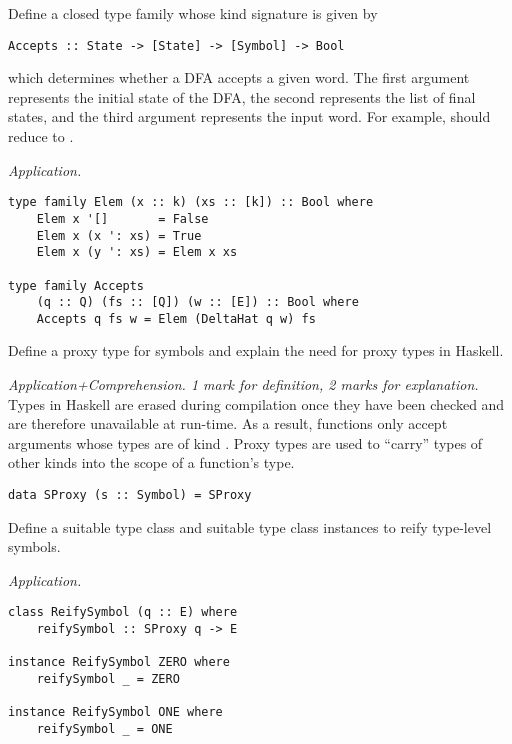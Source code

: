 \begin{parts}
\begin{subparts}
        \ifprintanswers \else \pagebreak \fi
    
        \subpart[8] Define a closed type family whose kind signature is given by 
        \vspace*{0.2cm}
\begin{verbatim}
Accepts :: State -> [State] -> [Symbol] -> Bool
\end{verbatim}
\vspace*{0.2cm}
        which determines whether a DFA accepts a given word. The first argument represents the initial state of the DFA, the second represents the list of final states, and the third argument represents the input word. For example,  should reduce to .
        \droppoints 
        
        \begin{solution}
            \emph{Application.}
\begin{verbatim}
type family Elem (x :: k) (xs :: [k]) :: Bool where 
    Elem x '[]       = False 
    Elem x (x ': xs) = True 
    Elem x (y ': xs) = Elem x xs

type family Accepts 
    (q :: Q) (fs :: [Q]) (w :: [E]) :: Bool where 
    Accepts q fs w = Elem (DeltaHat q w) fs
\end{verbatim}
        \end{solution}
        
        \subpart[3] Define a proxy type for symbols and explain the need for proxy types in Haskell. \droppoints 
        
        \begin{solution}
            \emph{Application+Comprehension. 1 mark for definition, 2 marks for explanation.} Types in Haskell are erased during compilation once they have been checked and are therefore unavailable at run-time. As a result, functions only accept arguments whose types are of kind \haskellIn{*}. Proxy types are used to ``carry'' types of other kinds into the scope of a function's type.
            
\begin{verbatim}
data SProxy (s :: Symbol) = SProxy
\end{verbatim}
        \end{solution}
        
        \subpart[4] Define a suitable type class and suitable type class instances to reify type-level symbols. \droppoints 
        
        \begin{solution}
            \emph{Application.} 
\begin{verbatim}
class ReifySymbol (q :: E) where 
    reifySymbol :: SProxy q -> E

instance ReifySymbol ZERO where 
    reifySymbol _ = ZERO 

instance ReifySymbol ONE where 
    reifySymbol _ = ONE
\end{verbatim}
        \end{solution}
        
    \end{subparts}
\end{parts}